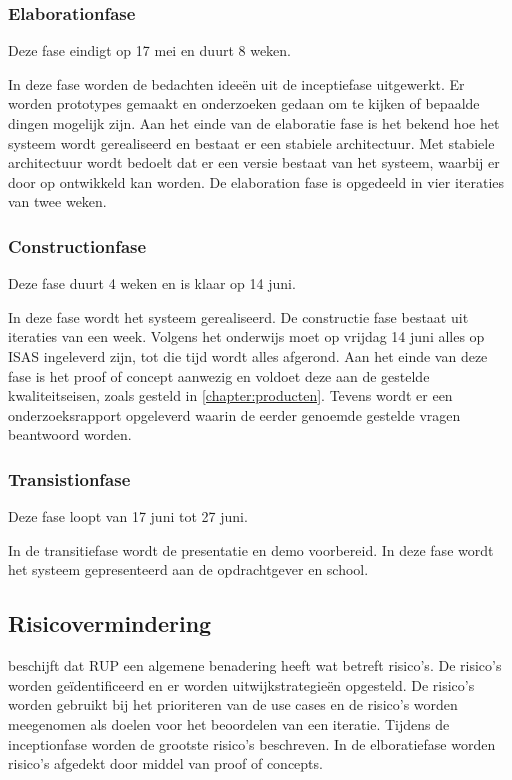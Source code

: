 \documentclass[a4paper, 11pt, oneside]{report}
\begin{document}
\subsubsection{Elaborationfase}
\label{sec:elaborationfase}
Deze fase eindigt op 17 mei  en duurt 8 weken.

In deze fase worden de bedachten ideeën uit de inceptiefase uitgewerkt.
Er worden prototypes gemaakt en onderzoeken gedaan om te kijken of bepaalde dingen mogelijk zijn.
Aan het einde van de elaboratie fase is het bekend hoe het systeem wordt gerealiseerd en bestaat er een stabiele architectuur.
Met stabiele architectuur wordt bedoelt dat er een versie bestaat van het systeem, waarbij er door op ontwikkeld kan worden.
De elaboration fase is opgedeeld in vier iteraties van twee weken.

\subsubsection{Constructionfase}
\label{sec:constructionfase}
Deze fase duurt 4 weken en is klaar op 14 juni.

In deze fase wordt het systeem gerealiseerd. De constructie fase bestaat uit iteraties van een week.
Volgens het onderwijs moet op vrijdag 14 juni alles op ISAS ingeleverd zijn, tot die tijd wordt alles afgerond.
Aan het einde van deze fase is het proof of concept aanwezig en voldoet deze aan de gestelde kwaliteitseisen, zoals gesteld in \autoref{chapter:producten}.
Tevens wordt er een onderzoeksrapport opgeleverd waarin de eerder genoemde gestelde vragen beantwoord worden.

\subsubsection{Transistionfase}
Deze fase loopt van 17 juni tot 27 juni.

In de transitiefase wordt de presentatie en demo voorbereid. 
In deze fase wordt het systeem gepresenteerd aan de opdrachtgever en school.

\subsection{Risicovermindering}
\citeauthor{IBMrup}\citeyear{IBMrup} beschijft dat RUP een algemene benadering heeft wat betreft risico's. De risico's worden geïdentificeerd en er worden uitwijkstrategieën opgesteld. De risico's worden gebruikt bij het prioriteren van de use cases en de risico's worden meegenomen als doelen voor het beoordelen van een iteratie. Tijdens de inceptionfase worden de grootste risico's beschreven. In de elboratiefase worden risico's afgedekt door middel van proof of concepts.
\end{document}
